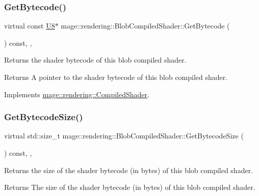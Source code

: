 \subsubsection{\texorpdfstring{Get\+Bytecode()}{GetBytecode()}}
{\footnotesize\ttfamily virtual const \mbox{\hyperlink{namespacemage_a30677c03d683c4c35630c25f6ff3fb7f}{U8}}$\ast$ mage\+::rendering\+::\+Blob\+Compiled\+Shader\+::\+Get\+Bytecode (\begin{DoxyParamCaption}{ }\end{DoxyParamCaption}) const\hspace{0.3cm}{\ttfamily [override]}, {\ttfamily [virtual]}, {\ttfamily [noexcept]}}

Returns the shader bytecode of this blob compiled shader.

\begin{DoxyReturn}{Returns}
A pointer to the shader bytecode of this blob compiled shader. 
\end{DoxyReturn}


Implements \mbox{\hyperlink{classmage_1_1rendering_1_1_compiled_shader_a469367d98fe910537a02868df0c85ec4}{mage\+::rendering\+::\+Compiled\+Shader}}.

\mbox{\label{classmage_1_1rendering_1_1_blob_compiled_shader_a259291746904bba3ab8bc096329d641e}} 
\subsubsection{\texorpdfstring{Get\+Bytecode\+Size()}{GetBytecodeSize()}}
{\footnotesize\ttfamily virtual std\+::size\+\_\+t mage\+::rendering\+::\+Blob\+Compiled\+Shader\+::\+Get\+Bytecode\+Size (\begin{DoxyParamCaption}{ }\end{DoxyParamCaption}) const\hspace{0.3cm}{\ttfamily [override]}, {\ttfamily [virtual]}, {\ttfamily [noexcept]}}

Returns the size of the shader bytecode (in bytes) of this blob compiled shader.

\begin{DoxyReturn}{Returns}
The size of the shader bytecode (in bytes) of this blob compiled shader. 
\end{DoxyReturn}


